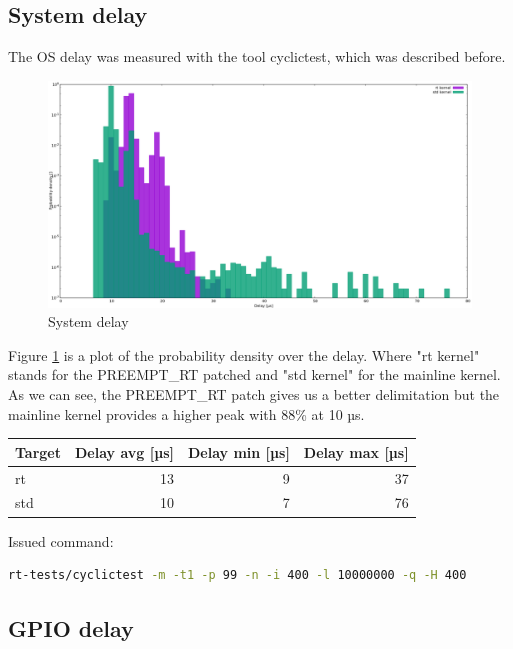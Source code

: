 \subsection{System delay}

The OS delay was measured with the tool cyclictest, which was described before.

\begin{figure}[tb]
	\centering
	\includegraphics[width=1.0\textwidth]{figures/plot_system.png}
	\caption{System delay}
	\label{fig:plot_system}
\end{figure}

Figure \ref{fig:plot_system} is a plot of the probability density over the delay. Where "rt kernel" stands for the PREEMPT\_RT patched and "std kernel" for the mainline kernel.
As we can see, the PREEMPT\_RT patch gives us a better delimitation but the mainline kernel provides a higher peak with 88\% at 10 µs.

\begin{center}
    \begin{tabular}{ | l | r | r | r | }
    \hline
    \textbf{Target} & \textbf{Delay avg} [µs] & \textbf{Delay min} [µs] & \textbf{Delay max} [µs] \\ \hline
    rt & 13 & 9 & 37 \\ \hline
    std & 10 & 7 & 76 \\ \hline
    \end{tabular}
\end{center}

Issued command:

\begin{lstlisting}[language=bash]
rt-tests/cyclictest -m -t1 -p 99 -n -i 400 -l 10000000 -q -H 400
\end{lstlisting}

\subsection{GPIO delay}

